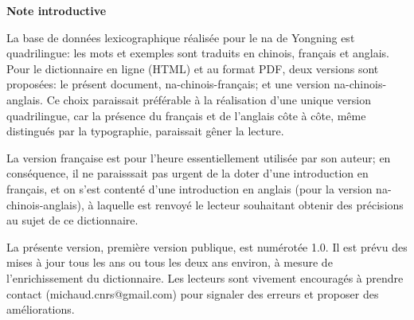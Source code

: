 	{\LARGE \textbf{Note introductive}}
	
La base de données lexicographique réalisée pour le na de Yongning est quadrilingue: les mots et exemples sont traduits en chinois, français et anglais. Pour le dictionnaire en ligne (HTML) et au format PDF, deux versions sont proposées: le présent document, na-chinois-français; et une version na-chinois-anglais. Ce choix paraissait préférable à la réalisation d'une unique version quadrilingue, car la présence du français et de l'anglais côte à côte, même distingués par la typographie, paraissait gêner la lecture.

La version française est pour l'heure essentiellement utilisée par son auteur; en conséquence, il ne paraisssait pas urgent de la doter d'une introduction en français, et on s'est contenté d'une introduction en anglais (pour la version na-chinois-anglais), à laquelle est renvoyé le lecteur souhaitant obtenir des précisions au sujet de ce dictionnaire. 

La présente version, première version publique, est numérotée 1.0. Il est prévu des mises à jour tous les ans ou tous les deux ans environ, à mesure de l'enrichissement du dictionnaire. Les lecteurs sont vivement encouragés à prendre contact (michaud.cnrs@gmail.com) pour signaler des erreurs et proposer des améliorations.



\cleardoublepage
{}
\setcounter{page}{1}

